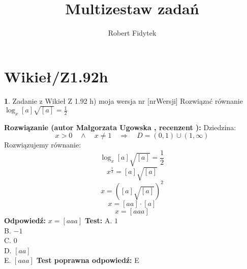 \documentclass[12pt, a4paper]{article}
\title{Multizestaw zadań}
\author{Robert Fidytek}
\date{}
\theoremstyle{definition} %
\newtheorem{zad}{}
\newcommand{\kategoria}[1]{\section{#1}} %
\newcommand{\zadStart}[1]{\begin{zad}#1\newline} %
\newcommand{\zadStop}{\end{zad}}   %
\newcommand{\rozwStart}[2]{\noindent \textbf{Rozwiązanie (autor #1 , recenzent #2): }\newline} %
\newcommand{\rozwStop}{\newline}                                            %
\newcommand{\odpStart}{\noindent \textbf{Odpowiedź:}\newline}    %
\newcommand{\odpStop}{\newline}                                             %
\newcommand{\testStart}{\noindent \textbf{Test:}\newline} %
\newcommand{\testStop}{\newline} %
\newcommand{\kluczStart}{\noindent \textbf{Test poprawna odpowiedź:}\newline} %
\newcommand{\kluczStop}{\newline} %
\begin{document}
\maketitle


\kategoria{Wikieł/Z1.92h}
\zadStart{Zadanie z Wikieł Z 1.92 h) moja wersja nr [nrWersji]}
Rozwiązać równanie $\log_{x}{[a] \sqrt{[a]}}=\frac{1}{2}$
\zadStop
\rozwStart{Małgorzata Ugowska}{}
Dziedzina:
$$x>0 \quad \land \quad x \ne 1 \quad \Longrightarrow \quad D =  (0,1) \cup (1, \infty)$$
Rozwiązujemy równanie:
$$\log_{x}{[a] \sqrt{[a]}}=\frac{1}{2}$$
$$x^{\frac{1}{2}}= [a] \sqrt{[a]}$$
$$x = ([a] \sqrt{[a]})^2$$
$$x = [aa] \cdot [a]$$
$$x = [aaa]$$
\rozwStop
\odpStart
$x =[aaa]$
\odpStop
\testStart
A. $1$\\
B. $-1$\\
C. $0$\\
D. $[aa]$\\
E. $[aaa]$
\testStop
\kluczStart
E
\kluczStop
\end{document}
